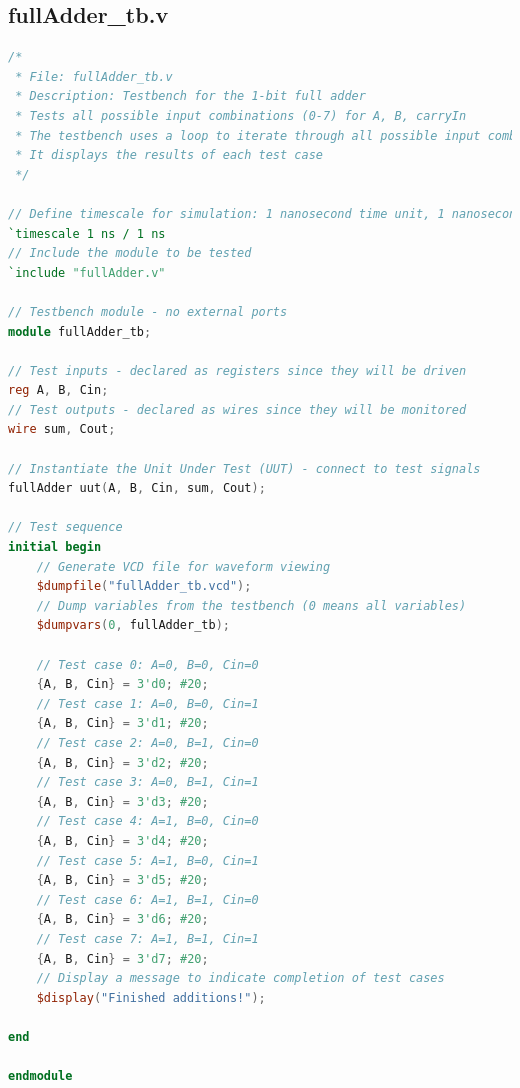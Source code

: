 \documentclass[a4paper,12pt]{article}
\begin{document}
\newpage

\subsection*{fullAdder\_tb.v}
\begin{lstlisting}[language=Verilog]
/*
 * File: fullAdder_tb.v
 * Description: Testbench for the 1-bit full adder
 * Tests all possible input combinations (0-7) for A, B, carryIn
 * The testbench uses a loop to iterate through all possible input combinations
 * It displays the results of each test case
 */
 
// Define timescale for simulation: 1 nanosecond time unit, 1 nanosecond precision
`timescale 1 ns / 1 ns
// Include the module to be tested
`include "fullAdder.v"

// Testbench module - no external ports
module fullAdder_tb;

// Test inputs - declared as registers since they will be driven
reg A, B, Cin;
// Test outputs - declared as wires since they will be monitored
wire sum, Cout;

// Instantiate the Unit Under Test (UUT) - connect to test signals
fullAdder uut(A, B, Cin, sum, Cout);

// Test sequence
initial begin
    // Generate VCD file for waveform viewing
    $dumpfile("fullAdder_tb.vcd");
    // Dump variables from the testbench (0 means all variables)
    $dumpvars(0, fullAdder_tb);
    
    // Test case 0: A=0, B=0, Cin=0
    {A, B, Cin} = 3'd0; #20;
    // Test case 1: A=0, B=0, Cin=1
    {A, B, Cin} = 3'd1; #20;
    // Test case 2: A=0, B=1, Cin=0
    {A, B, Cin} = 3'd2; #20;
    // Test case 3: A=0, B=1, Cin=1
    {A, B, Cin} = 3'd3; #20;
    // Test case 4: A=1, B=0, Cin=0
    {A, B, Cin} = 3'd4; #20;
    // Test case 5: A=1, B=0, Cin=1
    {A, B, Cin} = 3'd5; #20;
    // Test case 6: A=1, B=1, Cin=0
    {A, B, Cin} = 3'd6; #20;
    // Test case 7: A=1, B=1, Cin=1
    {A, B, Cin} = 3'd7; #20;
    // Display a message to indicate completion of test cases
    $display("Finished additions!");
    
end

endmodule
\end{lstlisting}

\newpage
\end{document}
